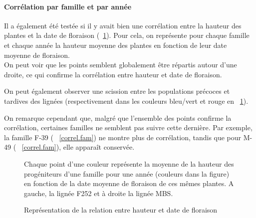 \documentclass[12pt,a4paper]{article}
\begin{document}
				\paragraph{Corrélation par famille et par année}
				Il a également été testée si il y avait bien une corrélation entre la hauteur des plantes et la date de floraison (~\ref{correlation}). Pour cela, on représente pour chaque famille et chaque année la hauteur moyenne des plantes en fonction de leur date moyenne de floraison.\\
				On peut voir que les points semblent globalement être répartis autour d'une droite, ce qui confirme la corrélation entre hauteur et date de floraison. 
				
				On peut également observer une scission entre les populations précoces et tardives des lignées (respectivement dans les couleurs bleu/vert et rouge en ~\ref{correlation}).
				
				
				
				
				
				On remarque cependant que, malgré que l'ensemble des points confirme la corrélation, certaines familles ne semblent pas suivre cette dernière. Par exemple, la famille F-39 ( ~\ref{correl.fam}) ne montre plus de corrélation, tandis que pour M-49 ( ~\ref{correl.fam}), elle apparaît conservée. 
				
				\begin{figure}[!h]
					\caption{Représentation de la relation entre hauteur et date de floraison \label{correlation}}
					Chaque point d'une couleur représente la moyenne de la hauteur des progéniteurs d'une famille pour une année (couleurs dans la figure) en fonction de la date moyenne de floraison de ces mêmes plantes. A gauche, la lignée F252 et à droite la lignée MBS.
				\end{figure}
				
\end{document}
